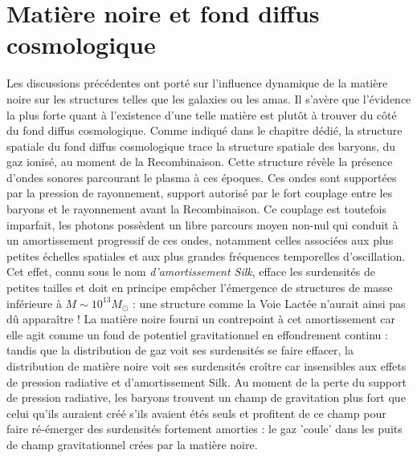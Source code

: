 \section{Matière noire et fond diffus cosmologique}

Les discussions précédentes ont porté sur l'influence dynamique de la matière noire sur les structures telles que les galaxies ou les amas. Il s'avère que l'évidence la plus forte quant à l'existence d'une telle matière est plutôt à trouver du côté du fond diffus cosmologique. Comme indiqué dans le chapitre dédié, la structure spatiale du fond diffus cosmologique trace la structure spatiale des baryons, du gaz ionisé, au moment de la Recombinaison. Cette structure révèle la présence d'ondes sonores parcourant le plasma à ces époques. Ces ondes sont supportées par la pression de rayonnement, support autorisé par le fort couplage entre les baryons et le rayonnement avant la Recombinaison. Ce couplage est toutefois imparfait, les photons possèdent un libre parcours moyen non-nul qui conduit à un amortissement progressif de ces ondes, notamment celles associées aux plus petites échelles spatiales et aux plus grandes fréquences temporelles d'oscillation. Cet effet, connu sous le nom \textit{d'amortissement Silk},  efface les surdensités de petites tailles et doit en principe empêcher l'émergence de structures de masse inférieure à $M\sim 10^{13} M_\odot$ : une structure comme la Voie Lactée n'aurait ainsi pas dû apparaître ! La matière noire fourni un contrepoint à cet amortissement car elle agit comme un fond de potentiel gravitationnel en effondrement continu : tandis que la distribution de gaz voit ses surdensités se faire effacer, la distribution de matière noire voit ses surdensités croître car insensibles aux effets de pression radiative et d'amortissement Silk. Au moment de la perte du support de pression radiative, les baryons trouvent un champ de gravitation plus fort que celui qu'ils auraient créé s'ils avaient étés seuls et profitent de ce champ pour faire ré-émerger des surdensités fortement amorties : le gaz 'coule' dans les puits de champ gravitationnel crées par la matière noire. 

